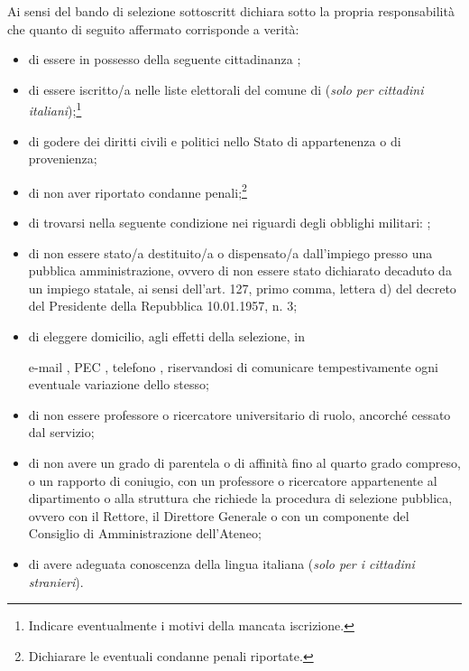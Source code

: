 	Ai sensi del bando di selezione  \myTextField[.5cm]{} sottoscritt\myTextField[.5cm]{}
	dichiara sotto la propria responsabilità che quanto di seguito affermato
	corrisponde a verità:
	\begin{itemize}
		\item di essere in possesso della seguente cittadinanza \myTextField{};
		\item di essere iscritto/a nelle liste elettorali del comune di \myTextField{}
		      (\emph{solo per cittadini italiani});\footnote{Indicare eventualmente i motivi
			      della mancata iscrizione.}

		      \myTextField[.9\textwidth]{}
		\item di godere dei diritti civili e politici nello Stato di appartenenza o di
		      provenienza;
		\item di non aver riportato condanne penali;\footnote{Dichiarare le eventuali
			      condanne penali riportate.}

		      \myTextField[.9\textwidth]{}
		\item di trovarsi nella seguente condizione nei riguardi degli obblighi militari:
		      \myTextField{};
		\item di non essere stato/a destituito/a o dispensato/a dall'impiego presso una
		      pubblica amministrazione, ovvero di non essere stato dichiarato decaduto da un
		      impiego statale, ai sensi dell'art. 127, primo comma, lettera d) del decreto
		      del Presidente della Repubblica 10.01.1957, n. 3;
		\item di eleggere domicilio, agli effetti della selezione, in
		      \begin{center}
			      \titleTextField[6cm]{}%
		      \end{center}
		      e-mail \myTextField[4cm]{}, PEC \myTextField[4cm]{}, telefono \myTextField{},
		      riservandosi di comunicare tempestivamente ogni eventuale variazione dello stesso;
		\item di non essere professore o ricercatore universitario di ruolo, ancorché
		      cessato dal servizio;
		\item di non avere un grado di parentela o di affinità fino al quarto grado
		      compreso, o un rapporto di coniugio, con un professore o ricercatore appartenente
		      al dipartimento o alla struttura che richiede la procedura di selezione pubblica,
		      ovvero con il Rettore, il Direttore Generale o con un componente del Consiglio
		      di Amministrazione dell’Ateneo;
		\item di avere adeguata conoscenza della lingua italiana (\emph{solo per i
			      cittadini stranieri}).
	\end{itemize}
